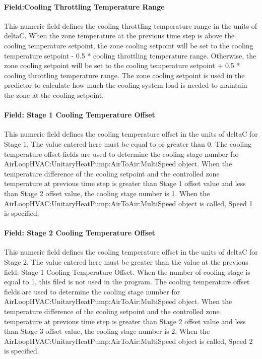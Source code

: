 \paragraph{Field:Cooling Throttling Temperature Range}\label{fieldcooling-throttling-temperature-range}

This numeric field defines the cooling throttling temperature range in the units of deltaC. When the zone temperature at the previous time step is above the cooling temperature setpoint, the zone cooling setpoint will be set to the cooling temperature setpoint - 0.5 * cooling throttling temperature range. Otherwise, the zone cooling setpoint will be set to the cooling temperature setpoint + 0.5 * cooling throttling temperature range. The zone cooling setpoint is used in the predictor to calculate how much the cooling system load is needed to maintain the zone at the cooling setpoint.

\paragraph{Field: Stage 1 Cooling Temperature Offset}\label{field-stage-1-cooling-temperature-offset}

This numeric field defines the cooling temperature offset in the units of deltaC for Stage 1. The value entered here must be equal to or greater than 0. The cooling temperature offset fields are used to determine the cooling stage number for AirLoopHVAC:UnitaryHeatPump:AirToAir:MultiSpeed object. When the temperature difference of the cooling setpoint and the controlled zone temperature at previous time step is greater than Stage 1 offset value and less than Stage 2 offset value, the cooling stage number is 1. When the AirLoopHVAC:UnitaryHeatPump:AirToAir:MultiSpeed object is called, Speed 1 is specified.

\paragraph{Field: Stage 2 Cooling Temperature Offset}\label{field-stage-2-cooling-temperature-offset}

This numeric field defines the cooling temperature offset in the units of deltaC for Stage 2. The value entered here must be greater than the value at the previous field: Stage 1 Cooling Temperature Offset. When the number of cooling stage is equal to 1, this filed is not used in the program. The cooling temperature offset fields are used to determine the cooling stage number for AirLoopHVAC:UnitaryHeatPump:AirToAir:MultiSpeed object. When the temperature difference of the cooling setpoint and the controlled zone temperature at previous time step is greater than Stage 2 offset value and less than Stage 3 offset value, the cooling stage number is 2. When the AirLoopHVAC:UnitaryHeatPump:AirToAir:MultiSpeed object is called, Speed 2 is specified.

